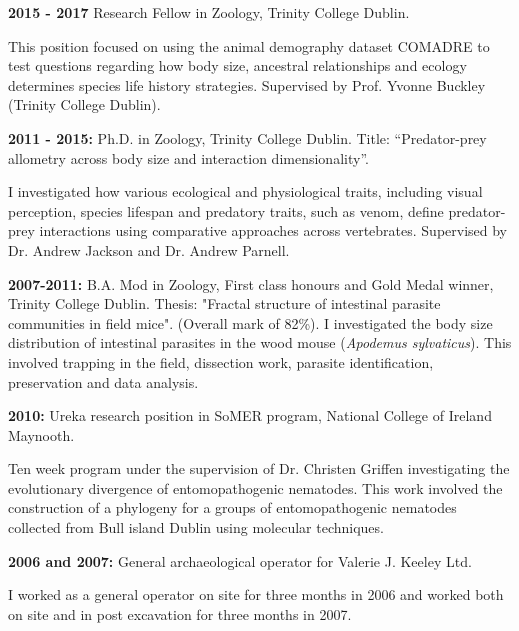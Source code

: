 \documentclass[10pt,a4paper]{article}
\begin{document}
\raggedright	
\textbf{2015 - 2017} Research Fellow in Zoology, Trinity College Dublin.
 \smallskip
\par{\fontsize{10.5}{10} This position focused on using the animal demography dataset COMADRE to test questions regarding how body size, ancestral relationships and ecology determines species life history strategies. Supervised by Prof. Yvonne Buckley (Trinity College Dublin).\bigskip}

\raggedright	
\textbf{2011 - 2015:} Ph.D. in Zoology, Trinity College Dublin. Title: “Predator-prey allometry across body size and interaction dimensionality”.\\ \par{\fontsize{10.5}{10} I investigated how various ecological and physiological traits, including visual perception, species lifespan and predatory traits, such as venom, define predator-prey interactions using comparative approaches across vertebrates. Supervised by Dr. Andrew Jackson and Dr. Andrew Parnell.
\bigskip}


\textbf{2007-2011:} B.A. Mod in Zoology, First class honours and Gold Medal winner, Trinity College Dublin.
Thesis: "Fractal structure of intestinal parasite communities in field mice". (Overall mark of 82\%).
I investigated the body size distribution of intestinal parasites in the wood mouse (\textit{Apodemus sylvaticus}). This involved trapping in the field, dissection work, parasite identification, preservation and data analysis.
\bigskip

\textbf{2010:} Ureka research position in SoMER program, National College of Ireland Maynooth.\\
\par{\fontsize{10.5}{10} Ten week program under the supervision of Dr. Christen Griffen investigating the evolutionary divergence of entomopathogenic nematodes. This work involved the construction of a phylogeny for a groups of entomopathogenic nematodes collected from Bull island Dublin using molecular techniques.}
\bigskip

\textbf{2006 and 2007:} General archaeological operator for Valerie J. Keeley Ltd.\\
\par{\fontsize{10.5}{10} I worked as a general operator on site for three months in 2006 and worked both on site
and in post excavation for three months in 2007.
}
\bigskip
\end{document}
